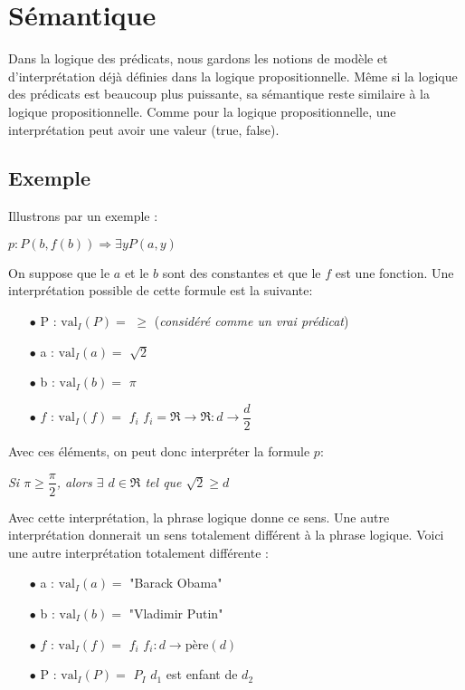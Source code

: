 \section{Sémantique}

Dans la logique des prédicats, nous gardons les notions de modèle et d'interprétation déjà définies dans la logique propositionnelle. Même si la logique des prédicats est beaucoup plus puissante, sa sémantique reste similaire à la logique propositionnelle.
Comme pour la logique propositionnelle, une interprétation peut avoir une valeur (true, false).

\subsection{Exemple}
Illustrons par un exemple : 

\begin{center}
$p : P(b,f(b)) \Rightarrow \exists y   P(a,y)$  \\
\vspace{3mm}
\end{center}
On suppose que le $a$ et le $b$ sont des constantes et que le $f$ est une fonction.
Une interprétation possible de cette formule est la suivante:
\begin{itemize}
\item[$\bullet$]P : $\mathrm{val}_{I}(P) = $ $ \geq $ \hspace{3mm} (\textit{considéré comme un vrai prédicat})
\item[$\bullet$] a : $\mathrm{val}_{I}(a) = $ $ \sqrt{2} $ 
\item[$\bullet$] b : $\mathrm{val}_{I}(b) = $ $ \pi $ 
\item[$\bullet$] $f$ : $\mathrm{val}_{I}(f) = $ $ f_{i} $ \hspace{3mm} $f_{i}= \Re \rightarrow \Re : d \rightarrow \dfrac{d}{2} $ 
\end{itemize}
Avec ces éléments, on peut donc interpréter la formule $p$:
\begin{center}
\textit{Si $\pi \geq  \dfrac{\pi}{2}$, alors $\exists$ $ d \in \Re$ tel que $\sqrt2 \geq d$ }
\end{center}
Avec cette interprétation, la phrase logique donne ce sens.
Une autre interprétation donnerait un sens totalement différent à la phrase logique. Voici une autre interprétation totalement différente :
\begin{itemize}
\item[$\bullet$] a : $\mathrm{val}_{I}(a) = $ "Barack Obama"
\item[$\bullet$] b : $\mathrm{val}_{I}(b) = $ "Vladimir Putin"
\item[$\bullet$] $f$ : $\mathrm{val}_{I}(f) = $ $ f_{i} $ \hspace{3mm} $f_{i}: d \rightarrow \mathrm{père}(d)$
\item[$\bullet$] P :  $\mathrm{val}_{I}(P) = $ $P_{I}$ \hspace{3mm} $d_{1}$ est enfant de $d_{2}$\\
\end{itemize}

